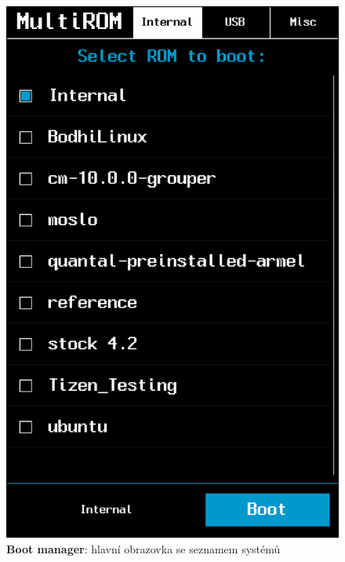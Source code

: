 \documentclass[12pt, a4paper, oneside]{article}
\newcommand{\B}{\textbf} %
\begin{document}
\begin{figure}[H]
\begin{center}
 \includegraphics[height=\textheight-70pt]{img/boot_manager.png}
\caption{\B{Boot manager}: hlavní obrazovka se seznamem systémů}
\end{center}
\end{figure}
\end{document}
